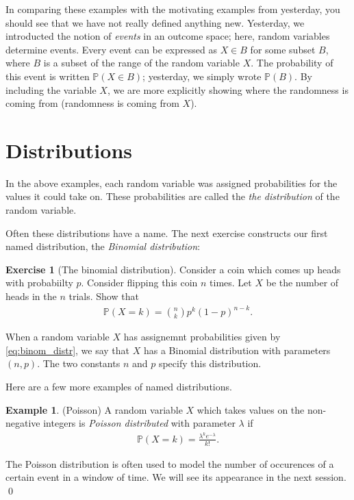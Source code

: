 \documentclass[11pt]{article}
\theoremstyle{definition}
\newtheorem{example}[theorem]{Example}
\newtheorem{exercise}[]{Exercise}
\renewcommand{\P}{\mathbb{P}}
\begin{document}
In comparing these examples with the motivating
examples from yesterday, you should see that
we have not really defined anything new.
Yesterday, we introducted the notion of \textit{events}
in an outcome space; here, random variables
determine events.
Every event can be expressed as $X\in B$ for some subset $B$, where
$B$ is a subset of the range of the random variable $X$.
The probability of this event is written
$\P(X\in B)$; yesterday, we simply wrote $\P(B)$.
By including the variable $X$, we are more
explicitly showing where the randomness is coming from
(randomness is coming from $X$).

\section{Distributions}

In the above examples, each random variable was assigned probabilities for
the values it could take on. These probabilities are called the
\textit{the distribution} of the random variable.

Often these distributions have a name. The next exercise constructs our
first named distribution, the \textit{Binomial distribution}:

\begin{exercise}[The binomial distribution]
Consider a coin which comes up heads with probabiilty $p$.
Consider flipping this coin $n$ times. Let $X$ be the number of
heads in the $n$ trials. Show that
\begin{align}
\P(X = k) = {n \choose k} p^k (1 - p)^{n - k}.
\label{eq:binom_distr}
\end{align}

\end{exercise}

When a random variable $X$ has assignemnt probabilities given by \eqref{eq:binom_distr},
we say that $X$ has a Binomial distribution with parameters $(n, p)$. The two constants
$n$ and $p$ specify this distribution.

Here are a few more examples of named distributions.

\begin{example}(Poisson)
A random variable $X$ which takes values on the non-negative integers is
\textit{Poisson distributed} with parameter $\lambda$ if
\begin{align}
  \P(X = k) = \frac{\lambda^k e^{-\lambda}}{k!}.
  \label{eq:poisson}
\end{align}

The Poisson distribution is often used to model the number of occurences
of a certain event in a window of time. We will see its appearance in the next session.
\qed
\end{example}
\end{document}
